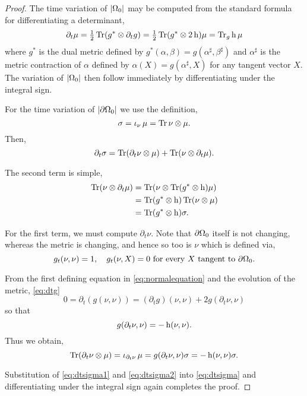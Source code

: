 \documentclass{amsart}
\begin{document}
\begin{proof}
The time variation of \(\left|{\Omega_0}\right|\) may be computed from the standard formula for differentiating a determinant,
\[
\partial_t \mu = \tfrac{1}{2}\operatorname{Tr}(g^{\ast} \otimes \partial_t g) =  \tfrac{1}{2} \operatorname{Tr} (g^{\ast} \otimes 2\operatorname{h})\mu = \operatorname{Tr}_g \operatorname{h} \mu
\]
where \(g^{\ast}\) is the dual metric defined by \(g^{\ast} (\alpha, \beta) = g(\alpha^{\sharp}, \beta^{\sharp})\) and \(\alpha^{\sharp}\) is the metric contraction of \(\alpha\) defined by \(\alpha(X) = g(\alpha^{\sharp}, X)\) for any tangent vector \(X\). The variation of \(\left|{\Omega_0}\right|\) then follow immediately by differentiating under the integral sign.

For the time variation of \(\left|{\partial {\Omega_0}}\right|\) we use the definition,
\[
\sigma = \operatorname{\iota}_{\nu} \mu = \operatorname{Tr} \nu \otimes \mu.
\]
Then,
\begin{equation}
\label{eq:dtsigma}
\partial_t \sigma = \operatorname{Tr}(\partial_t \nu \otimes \mu) + \operatorname{Tr}(\nu \otimes \partial_t \mu).
\end{equation}

The second term is simple,
\begin{equation}
\label{eq:dtsigma2}
\begin{split}
\operatorname{Tr}(\nu \otimes \partial_t \mu) &= \operatorname{Tr}(\nu \otimes \operatorname{Tr}(g^{\ast} \otimes \operatorname{h}) \mu) \\
&= \operatorname{Tr}(g^{\ast} \otimes \operatorname{h}) \operatorname{Tr} (\nu \otimes \mu) \\
&= \operatorname{Tr}(g^{\ast} \otimes \operatorname{h}) \sigma.
\end{split}
\end{equation}

For the first term, we must compute \(\partial_t \nu\). Note that \(\partial {\Omega_0}\) itself is not changing, whereas the metric is changing, and hence so too is \(\nu\) which is defined via,
\begin{equation}
\label{eq:normalequation}
g_t(\nu, \nu) = 1, \quad g_t(\nu, X) = 0 \text{ for every \(X\) tangent to \(\partial {\Omega_0}\)}.
\end{equation}

From the first defining equation in \eqref{eq:normalequation} and the evolution of the metric, \eqref{eq:dtg}
\[
0 = \partial_t (g(\nu, \nu)) = (\partial_t g) (\nu, \nu) + 2g(\partial_t \nu, \nu)
\]
so that
\[
g(\partial_t \nu, \nu) = -\operatorname{h}(\nu, \nu).
\]
Thus we obtain,
\begin{equation}
\label{eq:dtsigma1}
\operatorname{Tr}(\partial_t \nu \otimes \mu) = \operatorname{\iota}_{\partial_t\nu} \mu =  g(\partial_t \nu, \nu) \sigma = -\operatorname{h}(\nu, \nu) \sigma.
\end{equation}

Substitution of \eqref{eq:dtsigma1} and \eqref{eq:dtsigma2} into \eqref{eq:dtsigma} and differentiating under the integral sign again completes the proof.
\end{proof}
\end{document}

